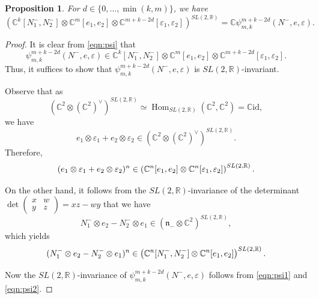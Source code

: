 \documentclass[reqno,11pt]{amsart}
\newtheorem{prop}[equation]{Proposition}
\theoremstyle{remark}
\numberwithin{equation}{section}
\newcommand{\eps}{\varepsilon}
\newcommand{\fn}{{\mathfrak n}}
\newcommand{\R}{\mathbb{R}}
\newcommand{\C}{\mathbb{C}}
\newcommand{\Hom}{\operatorname{Hom}}
\newcommand{\id}{\mathrm{id}}
\begin{document}
\begin{prop}\label{prop:psi}
For $d \in \{0, \ldots, \min(k,m)\}$,
we have 
\begin{equation*}
\left(\C^k[N_1^-, N_2^-] \otimes \C^m[e_1, e_2] \otimes 
\C^{m+k-2d}[\eps_1, \eps_2]\right)^{SL(2,\R)}
=\C\psi^{m+k-2d}_{m,k}(N^-, e, \eps).
\end{equation*}
\end{prop}

\begin{proof}
It is clear from \eqref{eqn:psi} that
\begin{equation*}
\psi^{m+k-2d}_{m,k}(N^-, e, \eps)
\in 
\C^k[N_1^-, N_2^-] \otimes \C^m[e_1, e_2] \otimes 
\C^{m+k-2d}[\eps_1, \eps_2].
\end{equation*}
Thus, it suffices to show that 
$\psi^{m+k-2d}_{m,k}(N^-, e, \eps)$ is $SL(2,\R)$-invariant.

Observe that as 
\begin{equation*}
\left(\C^2\otimes (\C^2)^\vee\right)^{SL(2,\R)}
\simeq
\Hom_{SL(2,\R)}(\C^2, \C^2)
=\C \id,
\end{equation*}
we have 
\begin{equation*}
e_1 \otimes \eps_1 + e_2 \otimes \eps_2 \in 
\left(\C^2\otimes (\C^2)^\vee\right)^{SL(2,\R)}.
\end{equation*}
Therefore,
\begin{equation}\label{eqn:psi1}
(e_1 \otimes \eps_1 + e_2 \otimes \eps_2)^n \in 
\left(\C^n[e_1, e_2]\otimes \C^n[\eps_1,\eps_2]\right)^{SL(2,\R)}.\\[3pt]
\end{equation}

On the other hand, it follows from the $SL(2,\R)$-invariance of the determinant
$
\det\begin{pmatrix} x & w \\ y & z \end{pmatrix}
=xz-wy
$
that we have 
\begin{equation*}
N_1^- \otimes e_2-N_2^-\otimes e_1
\in 
\left(\fn_-\otimes \C^2\right)^{SL(2,\R)},
\end{equation*}
which yields 
\begin{equation}\label{eqn:psi2}
(N_1^- \otimes e_2-N_2^-\otimes e_1)^n
\in \left(\C^n[N_1^-,N_2^-]\otimes \C^n[e_1,e_2]\right)^{SL(2,\R)}.\\[3pt]
\end{equation}

Now the $SL(2,\R)$-invariance of $\psi^{m+k-2d}_{m,k}(N^-, e, \eps)$ 
follows from \eqref{eqn:psi1} and \eqref{eqn:psi2}.
\end{proof}
\end{document}
